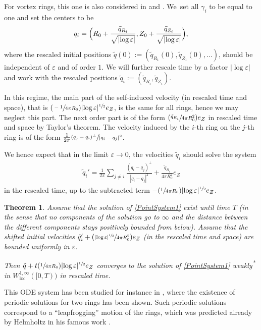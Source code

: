 \documentclass[10pt]{amsart}
\let\epsilon\varepsilon
\newcommand{\Psfrac}[2]{(\sfrac{#1}{#2})}
\newcommand{\loc}{\mathrm{loc}}
\newtheorem{theorem}{Theorem}[subsection]
\theoremstyle{definition}
\renewcommand\star{\textsuperscript{*} }
\newcommand\eq{=}
\let\eps\epsilon
\begin{document}
For vortex rings, this one is also considered in \cite{Davila2022leapfrogging} and \cite{JerrardSmets}. We~set all $\gamma_i$ to be equal to one and set the centers to be
\begin{align}\label{def regime1}
q_i\eq\Bigl(R_0+\frac{\tilde{q}_{R_i}}{\sqrt{|{\log\eps}|}},Z_0+\frac{\tilde{q}_{Z_i}}{\sqrt{|{\log\eps}|}}\Bigr),
\end{align}
where the rescaled initial positions $\tilde{q}(0):=(\tilde{q}_{R_1}(0),\tilde{q}_{Z_1}(0),\dots)$, should be independent of $\eps$ and of order $1$.
We will further rescale time by a factor $|{\log\eps}|$ and work with the rescaled positions $\tilde{q}_i:=(\tilde{q}_{R_i},\tilde{q}_{Z_i})$.

In this regime, the main part of the self-induced velocity (in rescaled time and space), that is $\Psfrac{-1}{4\pi R_0}|{\log\eps}|^{\sfrac{1}{2}}e_Z$, is the same for all rings, hence we may neglect this part. The next order part is of the form $\Psfrac{\tilde{q}_{R_i}}{4\pi R_0^2}e_Z$ in rescaled time and space by Taylor's theorem.
The velocity induced by the $i$-th ring on the $j$-th ring is of the form $\frac{1}{2\pi}\sfrac{(q_j-q_i)^\perp}{|q_i-q_j|^2}$.

We hence expect that in the limit $\eps\to 0$, the velocities $\tilde{q}_i$ should solve the system
\begin{align}\label{PointSystem1}
\tilde{q}_i'\eq\frac{1}{2\pi}\sum_{j\neq i}\frac{(q_i-q_j)^\perp}{|q_i-q_j|^2}+\frac{\tilde{q}_{R_i}}{4\pi R_0^2}e_Z
\end{align}
in the rescaled time, up to the subtracted term $-\Psfrac{1}{4\pi R_0}|{\log\eps}|^{\sfrac{1}{2}}e_Z$.


\begin{theorem}\label{Limit1}
Assume that the solution of \eqref{PointSystem1} exist until time $T$ (in the sense that no components of the solution go to $\infty$ and the distance between the different components stays positively bounded from below).
Assume that the shifted initial velocities $\tilde{q}_i'+\Psfrac{|{\log\eps}|^{\sfrac{1}{2}}}{4\pi R_0^2}e_Z$ (in the rescaled time and space) are bounded uniformly in $\eps$.

Then $\tilde{q}+t\Psfrac{1}{4\pi R_0}|{\log\eps}|^{\sfrac{1}{2}}e_Z$ converges to the solution of \eqref{PointSystem1} weakly\star in $W_{\loc}^{1,\infty}([0,T))$ in rescaled time.
\end{theorem}


This ODE system has been studied for instance in \cite{JerrardSmets}, where the existence of periodic solutions for two rings has been shown. Such periodic solutions correspond to a ``leapfrogging'' motion of the rings, which was predicted already by Helmholtz in his famous work \cite{helmholtz1858integrale,helmholtz1867lxiii}.
\end{document}
